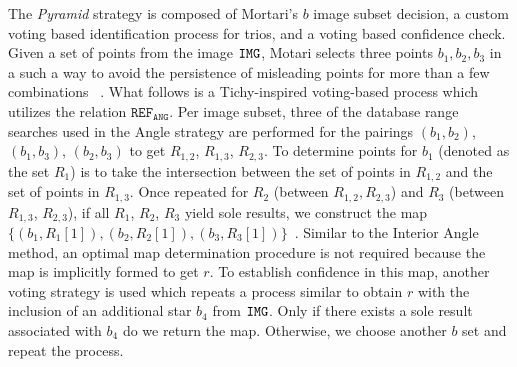 
The \textit{Pyramid} strategy is composed of Mortari's $b$ image subset decision, a custom voting based identification process for trios, and a voting based confidence check.
Given a set of points from the image $\texttt{IMG}$, Motari selects three points $b_1, b_2, b_3$ in a such a way to avoid the persistence of misleading points for more than a few combinations
~\cite{mortari:pyramidIdentification}.
What follows is a Tichy-inspired voting-based process which utilizes the relation $\texttt{REF}_\texttt{ANG}$.
Per image subset, three of the database range searches used in the Angle strategy are performed for the pairings $(b_1, b_2)$, $(b_1, b_3)$, $(b_2, b_3)$ to get $R_{1,2}$, $R_{1,3}$, $R_{2,3}$.
To determine points for $b_1$ (denoted as the set $R_1$) is to take the intersection between the set of points in $R_{1,2}$ and the set of points in $R_{1,3}$.
Once repeated for $R_2$ (between $R_{1,2}, R_{2,3}$) and $R_3$ (between $R_{1,3}$, $R_{2,3}$), if all $R_1$, $R_2$, $R_3$ yield sole results, we construct the map $\{ (b_1, R_1[1]), (b_2, R_2[1]), (b_3, R_3[1])\}$~\cite{tichy:preliminaryTestsCommericalImagers}.
Similar to the Interior Angle method, an optimal map determination procedure is not required because the map is implicitly formed to get $r$.
To establish confidence in this map, another voting strategy is used which repeats a process similar to obtain $r$ with the inclusion of an additional star $b_4$ from $\texttt{IMG}$.
Only if there exists a sole result associated with $b_4$ do we return the map.
Otherwise, we choose another $b$ set and repeat the process.

